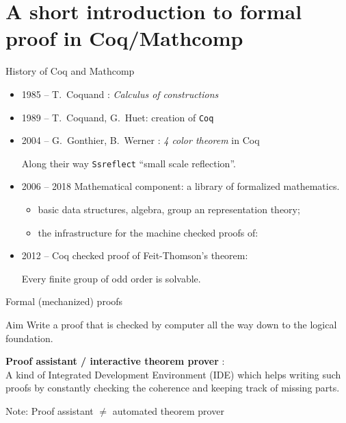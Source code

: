 \documentclass[compress,11pt]{beamer}
\newcommand{\red}[1]{{\color{red} #1}}
\newcommand{\grn}[1]{{\color{green} #1}}
\begin{document}
\section{A short introduction to formal proof in Coq/Mathcomp}
\begin{frame}{History of Coq and Mathcomp}

  \begin{itemize}
  \item 1985 -- T.~Coquand :  \emph{Calculus of constructions}
  \item 1989 -- T.~Coquand, G.~Huet: creation of \texttt{Coq}
  \item 2004 -- G.~Gonthier, B.~Werner : \emph{4 color theorem} in Coq

    Along their way \texttt{Ssreflect} ``small scale reflection''.

  \item 2006 -- 2018 Mathematical component: a library of formalized mathematics.
    \begin{itemize}
    \item basic data structures, algebra, group an representation theory;
    \item the infrastructure for the machine checked proofs of:
    \end{itemize}
  \item 2012 -- Coq checked proof of Feit-Thomson's theorem:

    Every finite group of odd order is solvable.
  \end{itemize}
\end{frame}

\begin{frame}{Formal (mechanized) proofs}

  \begin{block}{Aim}
    Write a proof that is checked by computer all the way down to the
    logical foundation.
  \end{block}
  \bigskip\pause

  \textbf{Proof assistant / interactive theorem prover} : \\ A kind of Integrated
  Development Environment (IDE) which helps writing such proofs by constantly
  checking the coherence and keeping track of missing parts.  \bigskip

  Note: Proof \grn{assistant} $\neq$ \red{automated} theorem prover
\end{frame}
\end{document}
